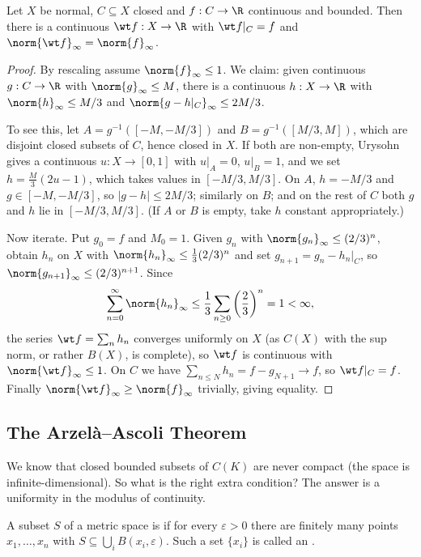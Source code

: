 \begin{theorem}
	Let $X$ be normal, $C \subseteq X$ closed and $f : C \to \R$ continuous and bounded. Then there is a continuous $\wt f : X \to \R$ with $\wt f|_C = f$ and $\norm{\wt f}_\infty = \norm{f}_\infty$.
\end{theorem}

\begin{proof}
	By rescaling assume $\norm{f}_\infty \leq 1$. We claim: given continuous $g : C \to \R$ with $\norm{g}_\infty \leq M$, there is a continuous $h : X \to \R$ with $\norm{h}_\infty \leq M/3$ and $\norm{g - h|_C}_\infty \leq 2M/3$.

	To see this, let $A = g^{-1}([-M,-M/3])$ and $B = g^{-1}([M/3, M])$, which are disjoint closed subsets of $C$, hence closed in $X$. If both are non-empty, Urysohn gives a continuous $u : X \to [0,1]$ with $u|_A = 0$, $u|_B = 1$, and we set $h = \frac{M}{3}(2u - 1)$, which takes values in $[-M/3, M/3]$. On $A$, $h = -M/3$ and $g \in [-M,-M/3]$, so $|g - h| \leq 2M/3$; similarly on $B$; and on the rest of $C$ both $g$ and $h$ lie in $[-M/3,M/3]$. (If $A$ or $B$ is empty, take $h$ constant appropriately.)

	Now iterate. Put $g_0 = f$ and $M_0 = 1$. Given $g_n$ with $\norm{g_n}_\infty \leq (2/3)^n$, obtain $h_n$ on $X$ with $\norm{h_n}_\infty \leq \frac13 (2/3)^n$ and set $g_{n+1} = g_n - h_n|_C$, so $\norm{g_{n+1}}_\infty \leq (2/3)^{n+1}$. Since
	$$\sum_{n=0}^\infty \norm{h_n}_\infty \leq \frac{1}{3}\sum_{n \geq 0}\left(\frac23\right)^n = 1 < \infty,$$
	the series $\wt f = \sum_n h_n$ converges uniformly on $X$ (as $C(X)$ with the sup norm, or rather $B(X)$, is complete), so $\wt f$ is continuous with $\norm{\wt f}_\infty \leq 1$. On $C$ we have $\sum_{n \leq N} h_n = f - g_{N+1} \to f$, so $\wt f|_C = f$. Finally $\norm{\wt f}_\infty \geq \norm{f}_\infty$ trivially, giving equality.
\end{proof}

\subsection{The Arzelà--Ascoli Theorem}

We know that closed bounded subsets of $C(K)$ are never compact (the space is infinite-dimensional). So what is the right extra condition? The answer is a uniformity in the modulus of continuity.

\begin{definition}
	A subset $S$ of a metric space is  if for every $\varepsilon > 0$ there are finitely many points $x_1, \dots, x_n$ with $S \subseteq \bigcup_i B(x_i,\varepsilon)$. Such a set $\{x_i\}$ is called an .
\end{definition}

